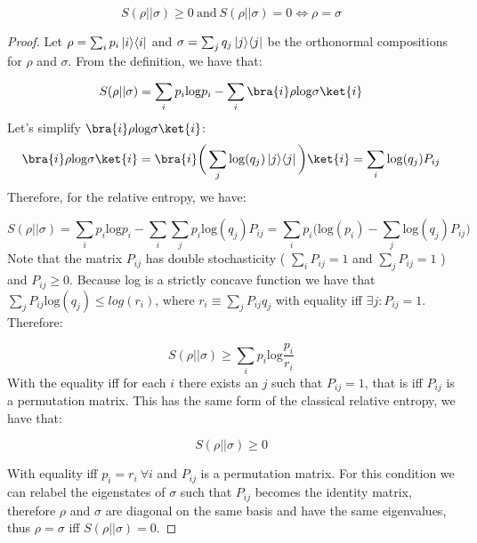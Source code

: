 \begin{theorem}

\begin{equation}
    S(\rho || \sigma) \geq 0 \ \mathrm{and} \ S(\rho || \sigma) = 0 \iff \rho = \sigma
\end{equation} 
\end{theorem}
\begin{proof}{\cite{nielsen_chuang_2010}}
Let $\rho = \sum_i p_i \left\vert{i}\middle\rangle\middle\langle{i}\right\vert$ and $\sigma = \sum_j q_j \left\vert{j}\middle\rangle\middle\langle{j}\right\vert$ be the orthonormal compositions for $\rho$ and $\sigma$.
From the definition, we have that:

\begin{equation}
    S(\rho||\sigma) = \sum_i p_i \mathrm{log} p_i - \sum_i \bra{i}\rho \mathrm{log}\sigma \ket{i}
\end{equation}
Let's simplify $\bra{i}\rho \mathrm{log}\sigma \ket{i}$:
\begin{equation}
    \bra{i}\rho \mathrm{log}\sigma \ket{i} = \bra{i}\bigg( \sum_j \mathrm{log}(q_j) \op{j}{j} \bigg)\ket{i} = \sum_i \mathrm{log}(q_j) P_{ij}
\end{equation}
Therefore, for the relative entropy, we have:

\begin{equation}
    S(\rho||\sigma) = \sum_i p_i \mathrm{log} p_i - \sum_i \sum_j p_i \mathrm{log}(q_j) P_{ij} = \sum_i p_i \bigg( \mathrm{log} (p_i) - \sum_j \mathrm{log}(q_j) P_{ij} \bigg)
\end{equation}
Note that the matrix $P_{ij}$ has double stochasticity ( $\sum_i P_{ij} = 1$ and $\sum_j P_{ij} = 1$ ) and $P_{ij} \geq 0$. Because log is a strictly concave function we have that $\sum_j P_{ij} \mathrm{log}(q_j) \leq log(r_i)$, where $r_i \equiv \sum_j P_{ij} q_j$ with equality iff $\exists j : P_{ij} =1$. Therefore:

\begin{equation}
    S(\rho||\sigma) \geq \sum_i p_i \mathrm{log} \frac{p_i}{r_i}
\end{equation}
With the equality iff for each $i$ there exists an $j$ such that $P_{ij} = 1$, that is iff $P_{ij}$ is a permutation matrix. This has the same form of the classical relative entropy, we have that:

\begin{equation}
    S(\rho||\sigma) \geq 0
\end{equation}

With equality iff $p_i = r_i \ \forall i$ and $P_{ij}$ is a permutation matrix. For this condition we can relabel the eigenstates of $\sigma$ such that $P_{ij}$ becomes the identity matrix, therefore $\rho$ and $\sigma$ are diagonal on the same basis and have the same eigenvalues, thus $\rho = \sigma$ iff $S(\rho||\sigma) = 0$. \qedsymbol
\end{proof}



